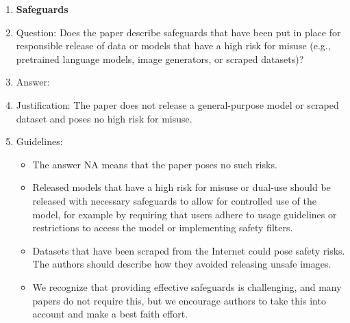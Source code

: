 \documentclass{article}
\theoremstyle{plain}
\theoremstyle{definition}
\theoremstyle{remark}
\begin{document}
{\begin{enumerate}
\item {\bf Safeguards}
    \item[] Question: Does the paper describe safeguards that have been put in place for responsible release of data or models that have a high risk for misuse (e.g., pretrained language models, image generators, or scraped datasets)?
    \item[] Answer: \answerNA{}
    \item[] Justification: The paper does not release a general-purpose model or scraped dataset and poses no high risk for misuse.
    \item[] Guidelines:
    \begin{itemize}
        \item The answer NA means that the paper poses no such risks.
        \item Released models that have a high risk for misuse or dual-use should be released with necessary safeguards to allow for controlled use of the model, for example by requiring that users adhere to usage guidelines or restrictions to access the model or implementing safety filters. 
        \item Datasets that have been scraped from the Internet could pose safety risks. The authors should describe how they avoided releasing unsafe images.
        \item We recognize that providing effective safeguards is challenging, and many papers do not require this, but we encourage authors to take this into account and make a best faith effort.
    \end{itemize}


\end{enumerate}}
\end{document}

